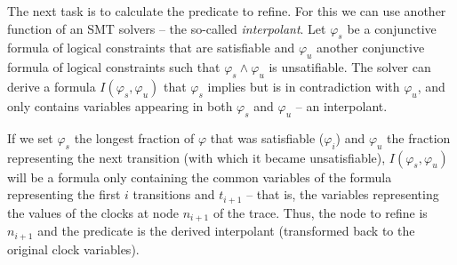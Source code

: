 The next task is to calculate the predicate to refine. For this we can use another function of an SMT solvers -- the so-called \emph{interpolant}.
Let $\varphi_s$ be a conjunctive formula of logical constraints that are satisfiable and $\varphi_u$ another conjunctive formula of logical constraints such that  $\varphi_s \wedge \varphi_u$ is unsatifiable. The solver can derive a formula $I(\varphi_s, \varphi_u)$ that $\varphi_s$ implies but is in contradiction with $\varphi_u$, and only contains variables appearing in both $\varphi_s$  and $\varphi_u$ -- an interpolant.

If we set $\varphi_s$ the longest fraction of $\varphi$ that was satisfiable ($\varphi_i$) and $\varphi_u$ the fraction representing the next transition (with which it became unsatisfiable), $I(\varphi_s, \varphi_u)$ will be a formula only containing the common variables of the formula representing the first $i$ transitions and $t_{i+1}$ -- that is, the variables representing the values of the clocks at node $n_{i+1}$ of the trace. Thus, the node to refine is $n_{i+1}$ and the predicate is the derived interpolant (transformed back to the original clock variables).

